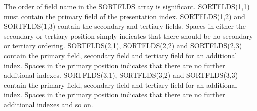 \documentclass[11pt,nolof]{starlink}
\begin{document}
\begin{small}
{{      The order of field name in the SORTFLDS array is significant.
      SORTFLDS(1,1) must contain the primary field of the presentation index.
      SORTFLDS(1,2) and SORTFLDS(1,3) contain the secondary and tertiary fields.
      Spaces in either the secondary or tertiary position simply indicates
      that there should be no secondary or tertiary ordering.
      SORTFLDS(2,1), SORTFLDS(2,2) and SORTFLDS(2,3) contain the primary field,
      secondary field and tertiary field for an additional index. Spaces in the
      primary position indicates that there are no further additional indexes.
      SORTFLDS(3,1), SORTFLDS(3,2) and SORTFLDS(3,3) contain the primary field,
      secondary field and tertiary field for an additional index. Spaces in the
      primary position indicates that there are no further additional indexes
      and so on.

}}
\end{small}
\end{document}
